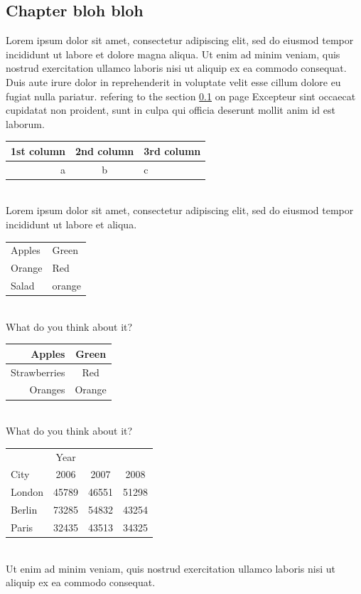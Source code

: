 \documentclass[a4paper,12pt]{article}
\begin{document}
\subsection{Chapter bloh bloh}
\label{sec 1}
Lorem ipsum dolor sit amet, consectetur adipiscing elit, sed do eiusmod tempor incididunt ut labore et dolore magna aliqua. Ut enim ad minim veniam, quis nostrud exercitation ullamco laboris nisi ut aliquip ex ea commodo consequat. Duis aute irure dolor in reprehenderit in voluptate velit esse cillum dolore eu fugiat nulla pariatur. refering to the section \ref{sec 1} on page \pageref{sec 1} Excepteur sint occaecat cupidatat non proident, sunt in culpa qui officia deserunt mollit anim id est laborum.\\
\begin{tabular}{r|cl}
1st column & 2nd column & 3rd column\\
\hline
a & b & c
\end{tabular}\\
\space
Lorem ipsum dolor sit amet, consectetur adipiscing elit, sed do eiusmod tempor incididunt ut labore et aliqua. \\
\begin{tabular}{l|l}
Apples & Green\\
Orange & Red\\
Salad & orange\\
\end{tabular}\\
What do you think about it?\\
\begin{tabular}{r|c}
Apples & Green \\
\hline
Strawberries & Red \\
\cline{2-2}
Oranges & Orange\\
\cline{1-1}
\end{tabular}\\
What do you think about it? \\
\begin{tabular}{l|ccc}
 & Year\\
\cline{2-4}
City & 2006 & 2007 & 2008 \\
\hline
London & 45789 & 46551 & 51298\\
Berlin & 73285 & 54832 & 43254\\
Paris & 32435 & 43513 & 34325 \\
\end{tabular}\\
Ut enim ad minim veniam, quis nostrud exercitation ullamco laboris nisi ut aliquip ex ea commodo consequat.\\
\end{document}
